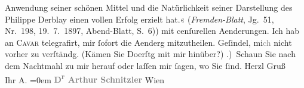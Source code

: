 \begin{ledgroupsized}[t]{13cm}
{{{                     Anwendung seiner schönen Mittel und die Natürlichkeit seiner Darstellung des
                     Philippe Derblay einen vollen Erfolg erzielt hat.« (\emph{Fremden-Blatt}, Jg. 51, Nr. 198,
                        19. 7. 1897, Abend-Blatt, S. 6)}}}\label{K_L00707_1h}) mit cenſurellen
               Aenderungen. Ich hab an \textsc{Cavar} telegrafirt, mir {\pb}ſofort die Aenderg
               mitzutheilen. Geſindel, mi\textcolor{gray}{ch} nicht vorher zu verſtändg. (Kämen Sie
                     Do{\geminationn}erſtg mit mir hinüber?)\pend
           .) Schaun Sie nach dem Nachtmahl zu mir herauf oder laſſen mir ſagen, wo Sie
               ſind.\pend
           \pstart
           Herzl Gruß{\\[\baselineskip]}Ihr \spacefill\mbox{A.}\pend
           \leftskip=0em{}\pstart
           \noindent{}\centering{}\textcolor{gray}{\textbf{D\textsuperscript{r} Arthur Schnitzler}}\pend
           \pstart
           \noindent{}\raggedleft{}Wien\pend
           
         
         \endnumbering{}\end{ledgroupsized}  \newcommand{\dateiname}{L00707}\newcommand{\titel}{Arthur Schnitzler an Richard Beer-Hofmann, 20. 7. 1897}\newcommand{\editorInnen}{Martin Anton Müller und Gerd-Hermann Susen}
      